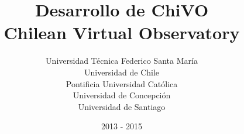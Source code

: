 \pagestyle{empty}
\title{Desarrollo de ChiVO \\ Chilean Virtual Observatory}
\author{Universidad T\'ecnica Federico Santa María \\ Universidad de Chile \\ Pontificia Universidad Católica \\ Universidad de Concepción \\ Universidad de Santiago}
\date{2013 - 2015}
\maketitle
\clearpage
